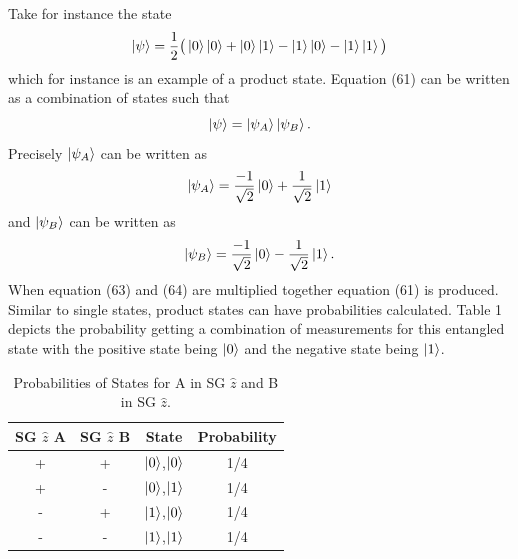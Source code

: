 \documentclass[twocolumn]{article}
\begin{document}
Take for instance the state
\begin{equation}
\ket{\psi}=\frac{1}{2}\big(\ket{0}\ket{0}+\ket{0}\ket{1}-\ket{1}\ket{0}-\ket{1}\ket{1}\big)
\end{equation}
which for instance is an example of a product state. Equation (61) can be written as a combination of states such that
\begin{equation}
\ket{\psi}=\ket{\psi_A}\ket{\psi_B}.
\end{equation}
Precisely $\ket{\psi_A}$ can be written as
\begin{equation}
\ket{\psi_A}=\frac{-1}{\sqrt{2}}\ket{0}+\frac{1}{\sqrt{2}}\ket{1}
\end{equation}
and $\ket{\psi_B}$ can be written as
\begin{equation}
\ket{\psi_B}=\frac{-1}{\sqrt{2}}\ket{0}-\frac{1}{\sqrt{2}}\ket{1}.
\end{equation}
When equation (63) and (64) are multiplied together equation (61) is produced. Similar to single states, product states can have probabilities calculated. Table 1 depicts the probability getting a combination of measurements for this entangled state with the positive state being $\ket{0}$ and the negative state being $\ket{1}$.
\begin{table}[h!]
\begin{center}
\begin{tabular}{ |c|c|c|c| }
\hline SG $\hat{z}$ A& SG $\hat{z}$ B& State& Probability \\ 
\hline +& +& $\ket{0}$,$\ket{0}$& 1/4 \\  
\hline +& -& $\ket{0}$,$\ket{1}$& 1/4 \\
\hline -& +& $\ket{1}$,$\ket{0}$& 1/4 \\
\hline -& -& $\ket{1}$,$\ket{1}$& 1/4 \\
\hline    
\end{tabular}
\caption{Probabilities of States for A in SG $\hat{z}$ and B in SG $\hat{z}$.}
\end{center}
\end{table} \\
\end{document}
